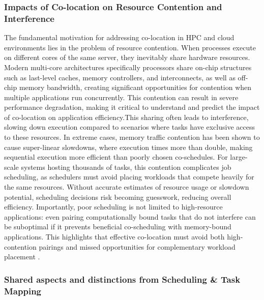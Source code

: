 \subsubsection{Impacts of Co-location on Resource Contention and Interference}
\label{sec:background_colocation_interference}
The fundamental motivation for addressing co-location in HPC and cloud environments lies in the problem of resource contention. When processes execute on different cores of the same server, they inevitably share hardware resources. Modern multi-core architectures specifically processors share on-chip structures such as last-level caches, memory controllers, and interconnects, as well as off-chip memory bandwidth, creating significant opportunities for contention when multiple applications run concurrently. This contention can result in severe performance degradation, making it critical to understand and predict the impact of co-location on application efficiency.This sharing often leads to interference, slowing down execution compared to scenarios where tasks have exclusive access to these resources. In extreme cases, memory traffic contention has been shown to cause super-linear slowdowns, where execution times more than double, making sequential execution more efficient than poorly chosen co-schedules. For large-scale systems hosting thousands of tasks, this contention complicates job scheduling, as schedulers must avoid placing workloads that compete heavily for the same resources. Without accurate estimates of resource usage or slowdown potential, scheduling decisions risk becoming guesswork, reducing overall efficiency. Importantly, poor scheduling is not limited to high-resource applications: even pairing computationally bound tasks that do not interfere can be suboptimal if it prevents beneficial co-scheduling with memory-bound applications. This highlights that effective co-location must avoid both high-contention pairings and missed opportunities for complementary workload placement \cite{inproceedings} \cite{10.1007/978-3-031-48803-0_31}.

\subsubsection{Shared aspects and distinctions from Scheduling \& Task Mapping}
\label{sec:background_colocation_scheduling}
